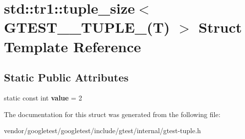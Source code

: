 \hypertarget{structstd_1_1tr1_1_1tuple__size_3_01GTEST__2__TUPLE___07T_08_01_4}{}\section{std\+:\+:tr1\+:\+:tuple\+\_\+size$<$ G\+T\+E\+S\+T\+\_\+\_\+\+T\+U\+P\+L\+E\+\_\+(T) $>$ Struct Template Reference}
\label{structstd_1_1tr1_1_1tuple__size_3_01GTEST__2__TUPLE___07T_08_01_4}
\subsection*{Static Public Attributes}
\begin{DoxyCompactItemize}
\item 
static const int {\bfseries value} = 2\hypertarget{structstd_1_1tr1_1_1tuple__size_3_01GTEST__2__TUPLE___07T_08_01_4_a18545d733fa1f811712aa1153d8ba5d9}{}\label{structstd_1_1tr1_1_1tuple__size_3_01GTEST__2__TUPLE___07T_08_01_4_a18545d733fa1f811712aa1153d8ba5d9}

\end{DoxyCompactItemize}


The documentation for this struct was generated from the following file\+:\begin{DoxyCompactItemize}
\item 
vendor/googletest/googletest/include/gtest/internal/gtest-\/tuple.\+h\end{DoxyCompactItemize}
